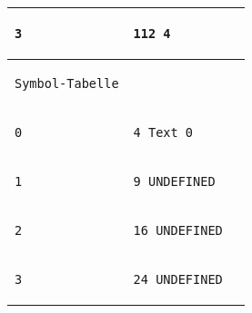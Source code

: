 \documentclass{ti2}
\begin{document}
\begin{tabular}{ | l | l | l|}
\begin{lstlisting}
3
\end{lstlisting} &
\begin{lstlisting}
112 4
\end{lstlisting} &
\begin{lstlisting}
\end{lstlisting} \\ \hline \hline

\begin{lstlisting}
Symbol-Tabelle
\end{lstlisting} &
\begin{lstlisting}
\end{lstlisting} &
\begin{lstlisting}
\end{lstlisting} \\ \hline

\begin{lstlisting}
0
\end{lstlisting} &
\begin{lstlisting}
4 Text 0
\end{lstlisting} &
\begin{lstlisting}
\end{lstlisting} \\ \hline


\begin{lstlisting}
1
\end{lstlisting} &
\begin{lstlisting}
9 UNDEFINED
\end{lstlisting} &
\begin{lstlisting}
\end{lstlisting} \\ \hline 

\begin{lstlisting}
2
\end{lstlisting} &
\begin{lstlisting}
16 UNDEFINED
\end{lstlisting} &
\begin{lstlisting}
\end{lstlisting} \\ \hline

\begin{lstlisting}
3
\end{lstlisting} &
\begin{lstlisting}
24 UNDEFINED
\end{lstlisting} &
\begin{lstlisting}
\end{lstlisting} \\ \hline 


\end{tabular}
\end{document}
